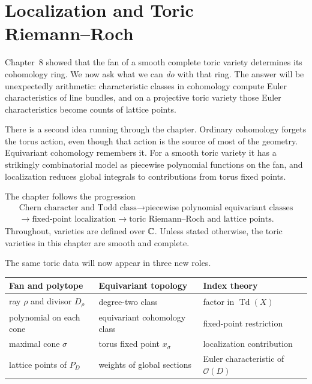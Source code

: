 \chapter[Localization and Toric Riemann--Roch]
{Localization and Toric\\ Riemann--Roch}
\label{chap:localization-toric-rr}

\begin{chapteroverview}
Chapter~8 showed that the fan of a smooth complete toric variety
determines its cohomology ring. We now ask what we can \emph{do} with
that ring. The answer will be unexpectedly arithmetic: characteristic
classes in cohomology compute Euler characteristics of line bundles,
and on a projective toric variety those Euler characteristics become
counts of lattice points.

There is a second idea running through the chapter. Ordinary
cohomology forgets the torus action, even though that action is the
source of most of the geometry. Equivariant cohomology remembers it.
For a smooth toric variety it has a strikingly combinatorial model as
piecewise polynomial functions on the fan, and localization reduces
global integrals to contributions from torus fixed points.

The chapter follows the progression
\[
\boxed{
\begin{gathered}
\text{Chern character and Todd class}
\longrightarrow
\text{piecewise polynomial equivariant classes}
\\[-1mm]
\longrightarrow
\text{fixed-point localization}
\longrightarrow
\text{toric Riemann--Roch and lattice points}.
\end{gathered}}
\]
Throughout, varieties are defined over \(\mathbb{C}\). Unless stated
otherwise, the toric varieties in this chapter are smooth and complete.
\end{chapteroverview}

\begin{threedictionaries}
The same toric data will now appear in three new roles.

\medskip

\begin{center}
\small
\begin{tabularx}{\linewidth}{@{}
  >{\raggedright\arraybackslash}X
  >{\raggedright\arraybackslash}X
  >{\raggedright\arraybackslash}X@{}}
\toprule
\textbf{Fan and polytope}
&
\textbf{Equivariant topology}
&
\textbf{Index theory}
\\
\midrule
ray \(\rho\) and divisor \(D_\rho\)
&
degree-two class
&
factor in \(\operatorname{Td}(X)\)
\\
polynomial on each cone
&
equivariant cohomology class
&
fixed-point restriction
\\
maximal cone \(\sigma\)
&
torus fixed point \(x_\sigma\)
&
localization contribution
\\
lattice points of \(P_D\)
&
weights of global sections
&
Euler characteristic of \(\mathcal O(D)\)
\\
\bottomrule
\end{tabularx}
\end{center}
\end{threedictionaries}

